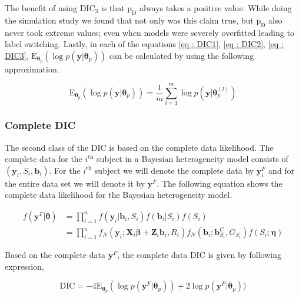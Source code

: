 The benefit of using $\text{DIC}_3$ is that $\text{p}_\text{D}$ always takes a positive value. While doing the simulation study we found that not only was this claim true, but $\text{p}_\text{D}$ also never took extreme values; even when models were severely overfitted leading to label switching. Lastly, in each of the equations \ref{eq : DIC1}, \ref{eq : DIC2}, \ref{eq : DIC3},  $\text{E}_{\boldsymbol{\theta}_p}(\log{p(\boldsymbol{y}|\boldsymbol{\theta}_p)}) $ can be calculated by using the following approximation.

\begin{equation}
\label{eq : mean_posterior_deviance_approx}
\text{E}_{\boldsymbol{\theta}_p}(\log{p(\boldsymbol{y}|\boldsymbol{\theta}_p)})  = \frac 1 m \sum_{l=1}^m\log{p(\boldsymbol{y}|\boldsymbol{\theta}_p^{(l)})}
\end{equation}

\subsubsection{Complete DIC}
The second class of the DIC is based on the complete data likelihood. The complete data for the $i^\text{th}$ subject in a Bayesian heterogeneity model consists of $(\boldsymbol{y}_i, S_i, \boldsymbol{b}_i)$. For the $i^\text{th}$ subject we will denote the complete data by $\boldsymbol{y}_i^F$ and for the entire data set we will denote it by $\boldsymbol{y}^F$. The following equation shows the complete data likelihood for the Bayesian heterogeneity model.

\begin{equation}
\label{eq : complete_data_likelihood}
\begin{split}
f(\boldsymbol{y}^F | \boldsymbol{\theta}) & = \prod_{i=1}^n f(\boldsymbol{y}_i|\boldsymbol{b}_i, S_i) f(\boldsymbol{b}_i|S_i) f(S_i)\\
& = \prod_{i=1}^n f_N(\boldsymbol{y}_i; \boldsymbol{X}_i\boldsymbol{\beta} + \boldsymbol{Z}_i \boldsymbol{b}_i, R_i) f_N(\boldsymbol{b}_i; \boldsymbol{b}_{S_i}^C, G_{S_i}) f(S_i; \boldsymbol{\eta})
\end{split}
\end{equation}

Based on the complete data $\boldsymbol{y}^F$, the complete data DIC is given by following expression,

\begin{equation}
\label{eq : complete_data_dic}
\text{DIC} = -4\text{E}_{\boldsymbol{\theta}_p}(\log{p(\boldsymbol{y}^F|\boldsymbol{\theta}_p)}) + 
2\log{p(\boldsymbol{y}^F|\boldsymbol{\bar{\theta}}_p)})
\end{equation}

